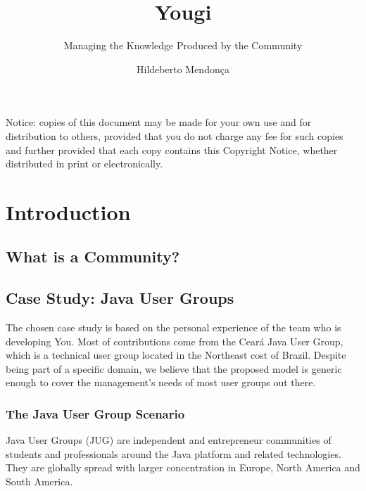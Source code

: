 \documentclass[envcountsame,envcountchap]{svmono}
\author{Hildeberto Mendon\c{c}a}
\title{Yougi}
\subtitle{Managing the Knowledge Produced by the Community}
\begin{document}
\maketitle

\frontmatter

\thispagestyle{empty}
\vspace*{3.5cm}
\begin{flushleft}
Notice: copies of this document may be made for your own use and for distribution to others, provided that you do not charge any fee for such copies and further provided that each copy contains this Copyright Notice, whether distributed in print or electronically.
\end{flushleft}

\tableofcontents

\listoffigures

\listoftables

\mainmatter

\chapter{Introduction}

\section{What is a Community?}

\section{Case Study: Java User Groups}

The chosen case study is based on the personal experience of the team who is developing You. Most of contributions come from the Cear\'{a} Java User Group, which is a technical user group located in the Northeast cost of Brazil. Despite being part of a specific domain, we believe that the proposed model is generic enough to cover the management's needs of most user groups out there.

\subsection{The Java User Group Scenario}

Java User Groups (JUG) are independent and entrepreneur communities of students and professionals around the Java platform and related technologies. They are globally spread with larger concentration in Europe, North America and South America.
\end{document}
